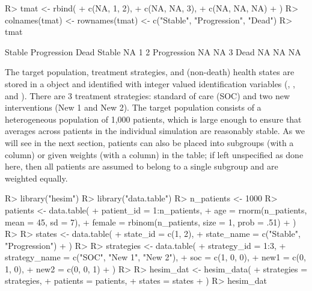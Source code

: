 \documentclass[article, nojss]{jss}\usepackage[]{graphicx}\usepackage[]{color}
\begin{document}
\begin{Schunk}
\begin{Sinput}
R> tmat <- rbind(
+    c(NA, 1, 2),
+    c(NA, NA, 3),
+    c(NA, NA, NA)
+  )
R> colnames(tmat) <- rownames(tmat) <- c("Stable", "Progression", "Dead")
R> tmat
\end{Sinput}
\begin{Soutput}
            Stable Progression Dead
Stable          NA           1    2
Progression     NA          NA    3
Dead            NA          NA   NA
\end{Soutput}
\end{Schunk}

The target population, treatment strategies, and (non-death) health states are stored in a  object and identified with integer valued identification variables (, , and ). There are 3 treatment strategies: standard of care (SOC) and two new interventions (New 1 and New 2). The target population consists of a heterogeneous population of 1,000 patients, which is large enough to ensure that averages across patients in the individual simulation are reasonably stable. As we will see in the next section, patients can also be placed into subgroups (with a  column) or given weights (with a  column) in the  table; if left unspecified as done here, then all patients are assumed to belong to a single subgroup and are weighted equally.

\begin{Schunk}
\begin{Sinput}
R> library("hesim")
R> library("data.table")
R> n_patients <- 1000
R> patients <- data.table(
+    patient_id = 1:n_patients,
+    age = rnorm(n_patients, mean = 45, sd = 7),
+    female = rbinom(n_patients, size = 1, prob = .51)
+  )
R> 
R> states <- data.table(
+    state_id = c(1, 2),
+    state_name = c("Stable", "Progression") 
+  )
R> 
R> strategies <- data.table(
+    strategy_id = 1:3,
+    strategy_name = c("SOC", "New 1", "New 2"),
+    soc = c(1, 0, 0),
+    new1 = c(0, 1, 0),
+    new2 = c(0, 0, 1)
+  )
R> 
R> hesim_dat <- hesim_data(
+    strategies = strategies,
+    patients = patients,
+    states = states
+  )
R> hesim_dat
\end{Sinput}
\end{Schunk}
\end{document}
